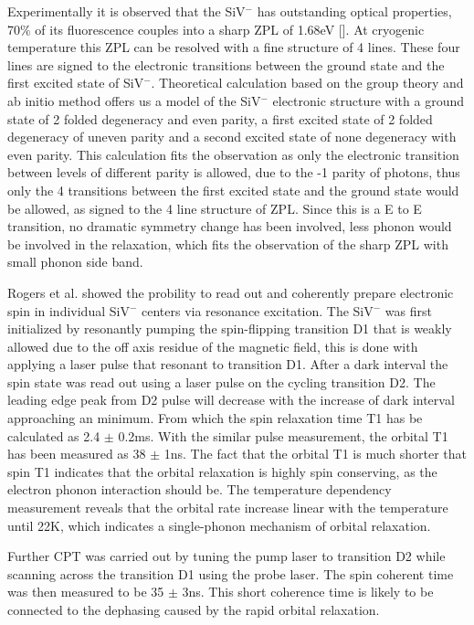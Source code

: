 Experimentally it is observed that the SiV$^{-}$ has outstanding optical properties, 70$\%$ of its fluorescence couples into a sharp ZPL of 1.68eV []. At cryogenic temperature this ZPL can be resolved with a fine structure of 4 lines. These four lines are signed to the electronic transitions between the ground state and the first excited state of SiV$^{-}$. Theoretical calculation based on the group theory and ab initio method offers us a model of the SiV$^{-}$ electronic structure with a ground state of 2 folded degeneracy and even parity, a first excited state of 2 folded degeneracy of uneven parity and a second excited state of none degeneracy with even parity. \citep{goss_twelve-line_1996} This calculation fits the observation as only the electronic transition between levels of different parity is allowed, due to the -1 parity of photons, thus only the 4 transitions between the first excited state and the ground state would be allowed, as signed to the 4 line structure of ZPL. Since this is a E to E transition, no dramatic symmetry change has been involved, less phonon would be involved in the relaxation, which fits the observation of the sharp ZPL with small phonon side band. 

Rogers et al. showed the probility to read out and coherently prepare electronic spin in individual SiV$^{-}$ centers via resonance excitation. The SiV$^{-}$ was first initialized by resonantly pumping the spin-flipping transition D1 that is weakly allowed due to the off axis residue of the magnetic field, this is done with applying a laser pulse that resonant to transition D1. After a dark interval the spin state was read out using a laser pulse on the cycling transition D2. The leading edge peak from D2 pulse will decrease with the increase of dark interval approaching an minimum. From which the spin relaxation time T1 has be calculated as 2.4 $\pm$ 0.2ms. With the similar pulse measurement, the orbital T1 has been measured as 38 $\pm$ 1ns. The fact that the orbital T1 is much shorter that spin T1 indicates that the orbital relaxation is highly spin conserving, as the electron phonon interaction should be.  The temperature dependency measurement reveals that the orbital rate increase linear with the temperature until 22K, which indicates a single-phonon mechanism of orbital relaxation.\citep{rogers_all-optical_2014,orbach_spin-lattice_1961,rogers_electronic_2014,scott_spin-lattice_1962}

Further CPT was carried out by tuning the pump laser to transition D2 while scanning across the transition D1 using the probe laser. The spin coherent time was then measured to be 35 $\pm$ 3ns. This short coherence time is likely to be connected to the dephasing caused by the rapid orbital relaxation.\citep{rogers_all-optical_2014}

